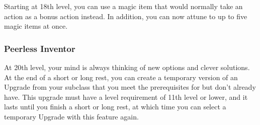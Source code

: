 \documentclass[11pt,twoside,openany]{book}  %
\begin{document}
Starting at 18th level, you can use a magic item that would normally take an action as a bonus action instead. In addition, you can now attune to up to five magic items at once.

\subsubsection{Peerless Inventor}

At 20th level, your mind is always thinking of new options and clever solutions. At the end of a short or long rest, you can create a temporary version of an Upgrade from your subclass that you meet the prerequisites for but don’t already have. This upgrade must have a level requirement of 11th level or lower, and it lasts until you finish a short or long rest, at which time you can select a temporary Upgrade with this feature again.
\end{document}

